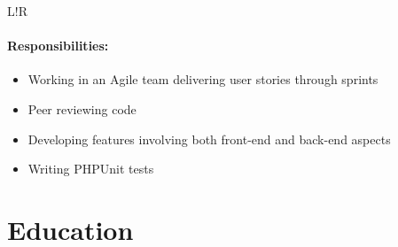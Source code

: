 \documentclass[10pt]{article}
\newcommand\VRule{\color{lightgray}\vrule width 0.5pt}
\begin{document}
\begin{longtable}{L!{\VRule}R}
\vspace{-3mm}
\paragraph{Responsibilities:}
\begin{itemize}[noitemsep,topsep=0pt]
    \item Working in an Agile team delivering user stories through sprints
    \item Peer reviewing code
    \item Developing features involving both front-end and back-end aspects
    \item Writing PHPUnit tests
\end{itemize}
\end{longtable}

\section*{Education}
\end{document}
